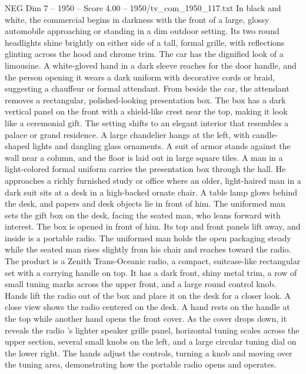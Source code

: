 \begin{textsample}{NEG Dim 7 – 1950 – Score 4.00 – 1950/tv\_com\_1950\_117.txt}  \label{ex:f7_neg_086}
In black and white, the commercial begins in darkness with the front of a large, glossy automobile approaching or standing in a dim outdoor setting.
Its two round headlights shine brightly on either side of a tall, formal grille, with reflections glinting across the hood and chrome trim.
The car has the dignified look of a limousine.
A white-gloved hand in a dark sleeve reaches for the door handle, and the person opening it wears a dark uniform with decorative cords or braid, suggesting a chauffeur or formal attendant.
From beside the car, the attendant removes a rectangular, polished-looking presentation box.
The box has a dark vertical panel on the front with a shield-like crest near the top, making it look like a ceremonial gift.
The setting shifts to an elegant interior that resembles a palace or grand residence.
A large chandelier hangs at the left, with candle-shaped lights and dangling glass ornaments.
A suit of armor stands against the wall near a column, and the floor is laid out in large square tiles.
A man in a light-colored formal uniform carries the presentation box through the hall.
He approaches a richly furnished study or office where an older, light-haired man in a dark suit sits at a desk in a high-backed ornate chair.
A table lamp glows behind the desk, and papers and desk objects lie in front of him.
The uniformed man sets the gift box on the desk, facing the seated man, who leans forward with interest.
The box is opened in front of him.
Its top and front panels lift away, and inside is a portable radio.
The uniformed man holds the open packaging steady while the seated man rises slightly from his chair and reaches toward the radio.
The product is a Zenith Trans-Oceanic radio, a compact, suitcase-like rectangular set with a carrying handle on top.
It has a dark front, shiny metal trim, a row of small tuning marks across the upper front, and a large round control knob.
Hands lift the radio out of the box and place it on the desk for a closer look.
A close view shows the radio centered on the desk.
A hand rests on the handle at the top while another hand opens the front cover.
As the cover drops down, it reveals the radio ’s lighter speaker grille panel, horizontal tuning scales across the upper section, several small knobs on the left, and a large circular tuning dial on the lower right.
The hands adjust the controls, turning a knob and moving over the tuning area, demonstrating how the portable radio opens and operates.

\end{textsample}
